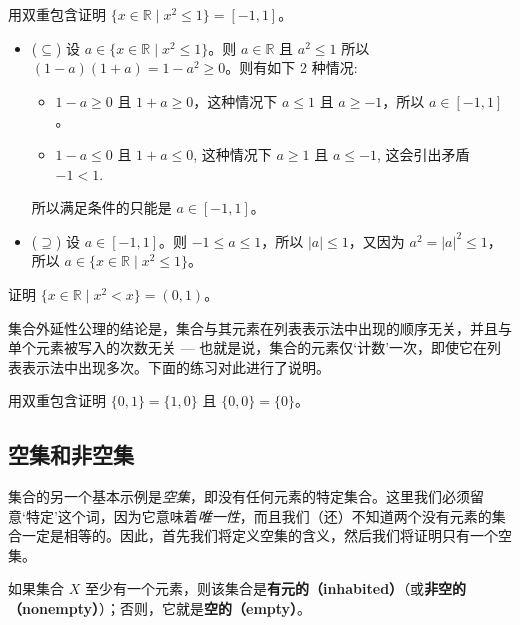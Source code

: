 \begin{example}
\label{exPositiveNegativeSetBuilderNotation}
用双重包含证明 $\{ x \in \mathbb{R} \mid x^2 \le 1 \} = [-1,1]$。
\begin{itemize}
\item ($\subseteq$) 设 $a \in \{ x \in \mathbb{R} \mid x^2 \le 1 \}$。则 $a \in \mathbb{R}$ 且 $a^2 \le 1$ 所以 $(1-a)(1+a) = 1-a^2 \ge 0$。则有如下 2 种情况:
\begin{itemize}
\item $1-a \ge 0$ 且 $1+a \ge 0$，这种情况下 $a \le 1$ 且 $a \ge -1$，所以 $a \in [-1,1]$。
\item $1-a \le 0$ 且 $1+a \le 0$, 这种情况下 $a \ge 1$ 且 $a \le -1$, 这会引出矛盾 $-1 < 1$.
\end{itemize}
所以满足条件的只能是 $a \in [-1,1]$。

\item ($\supseteq$) 设 $a \in [-1,1]$。则 $-1 \le a \le 1$，所以 $|a| \le 1$，又因为 $a^2 = |a|^2 \le 1$，所以 $a \in \{ x \in \mathbb{R} \mid x^2 \le 1 \}$。
\end{itemize}
\end{example}

\begin{exercise}
证明 $\{ x \in \mathbb{R} \mid x^2 < x \} = (0,1)$。
\end{exercise}

集合外延性公理的结论是，集合与其元素在列表表示法中出现的顺序无关，并且与单个元素被写入的次数无关 --- 也就是说，集合的元素仅`计数'一次，即使它在列表表示法中出现多次。下面的练习对此进行了说明。

\begin{exercise}
用双重包含证明 $\{ 0, 1 \} = \{ 1, 0 \}$ 且 $\{ 0, 0 \} = \{ 0 \}$。
\end{exercise}

\subsection*{空集和非空集}

集合的另一个基本示例是\textit{空集}，即没有任何元素的特定集合。这里我们必须留意`特定'这个词，因为它意味着\textit{唯一性}，而且我们（还）不知道两个没有元素的集合一定是相等的。因此，首先我们将定义空集的含义，然后我们将证明只有一个空集。

\begin{definition}
\label{defInhabited}
\label{defEmptyProperty}
如果集合 $X$ 至少有一个元素，则该集合是\textbf{有元的（inhabited）}（或\textbf{非空的（nonempty）}）；否则，它就是\textbf{空的（empty）}。
\end{definition}

